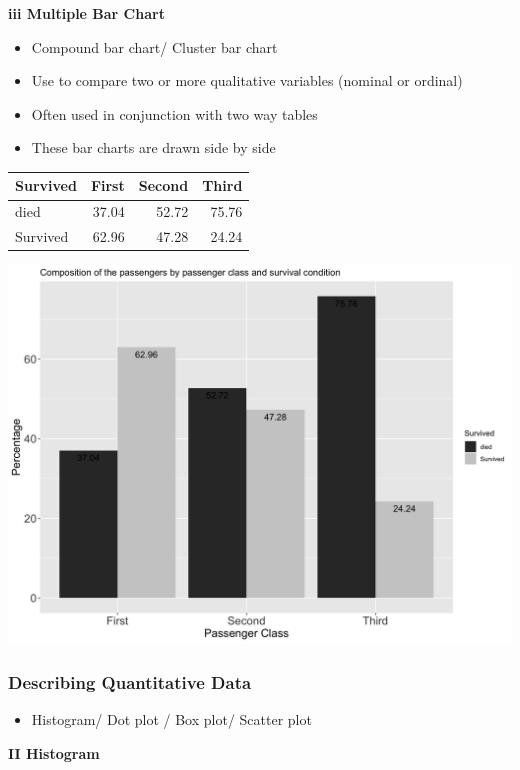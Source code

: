 \documentclass[]{book}
\providecommand{\tightlist}{%
  \setlength{\itemsep}{0pt}\setlength{\parskip}{0pt}}
\begin{document}
\textbf{iii Multiple Bar Chart}

\begin{itemize}
\tightlist
\item
  Compound bar chart/ Cluster bar chart
\item
  Use to compare two or more qualitative variables (nominal or ordinal)
\item
  Often used in conjunction with two way tables
\item
  These bar charts are drawn side by side
\end{itemize}

\begin{tabular}{l|r|r|r}
\hline
Survived & First & Second & Third\\
\hline
died & 37.04 & 52.72 & 75.76\\
\hline
Survived & 62.96 & 47.28 & 24.24\\
\hline
\end{tabular}

\begin{center}\includegraphics[width=0.8\linewidth]{figure/box12-1} \end{center}

\hypertarget{describing-quantitative-data}{%
\subsubsection{Describing Quantitative Data}\label{describing-quantitative-data}}

\begin{itemize}
\tightlist
\item
  Histogram/ Dot plot / Box plot/ Scatter plot
\end{itemize}

\textbf{II Histogram}
\end{document}
